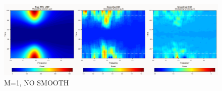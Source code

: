 \documentclass{article}
\begin{document}
\begin{figure}
    \centering
    \includegraphics[width=\linewidth]{Fig/smoothgrams_UMP_B200_rev_raw.png}
    \caption{M=1, NO SMOOTH}
    \label{fig:enter-label}
\end{figure}
\end{document}
